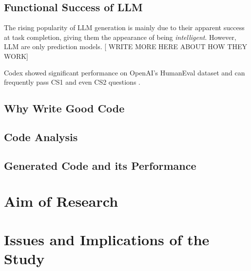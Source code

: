 \documentclass[manuscript,screen,review,sigconf]{acmart}
\begin{document}
\subsection{Functional Success of LLM}
The rising popularity of LLM generation is mainly due to their apparent success at task completion, giving them the appearance of being \textit{intelligent}. However, LLM are only prediction models. [ WRITE MORE HERE ABOUT HOW THEY WORK]


Codex showed significant performance on OpenAI's HumanEval dataset\cite{CodexRelPaper} and can frequently pass CS1 and even CS2 questions \cite{Codex_CS1_CS2_Test}. 

\subsection{Why Write Good Code}

\subsection{Code Analysis}

\subsection{Generated Code and its Performance}

\section{Aim of Research}

\section{Issues and Implications of the Study}
% 
\end{document}
